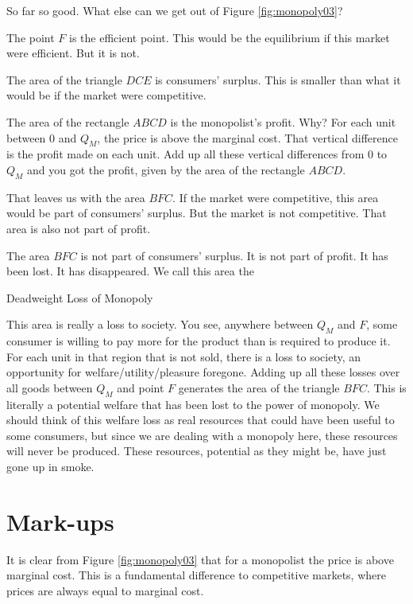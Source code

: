 \documentclass[
]{book}
\begin{document}
So far so good. What else can we get out of Figure \ref{fig:monopoly03}?

The point \(F\) is the efficient point. This would be the equilibrium if this market were efficient. But it is not.

The area of the triangle \(DCE\) is consumers' surplus. This is smaller than what it would be if the market were competitive.

The area of the rectangle \(ABCD\) is the monopolist's profit. Why? For each unit between \(0\) and \(Q_M\), the price is above the marginal cost. That vertical difference is the profit made on each unit. Add up all these vertical differences from \(0\) to \(Q_M\) and you got the profit, given by the area of the rectangle \(ABCD\).

That leaves us with the area \(BFC\). If the market were competitive, this area would be part of consumers' surplus. But the market is not competitive. That area is also not part of profit.

The area \(BFC\) is not part of consumers' surplus. It is not part of profit. It has been lost. It has disappeared. We call this area the

\begin{center}
Deadweight Loss of Monopoly

\end{center}

This area is really a loss to society. You see, anywhere between \(Q_M\) and \(F\), some consumer is willing to pay more for the product than is required to produce it. For each unit in that region that is not sold, there is a loss to society, an opportunity for welfare/utility/pleasure foregone. Adding up all these losses over all goods between \(Q_M\) and point \(F\) generates the area of the triangle \(BFC\). This is literally a potential welfare that has been lost to the power of monopoly. We should think of this welfare loss as real resources that could have been useful to some consumers, but since we are dealing with a monopoly here, these resources will never be produced. These resources, potential as they might be, have just gone up in smoke.

\hypertarget{mark-ups}{%
\section{Mark-ups}\label{mark-ups}}

It is clear from Figure \ref{fig:monopoly03} that for a monopolist the price is above marginal cost. This is a fundamental difference to competitive markets, where prices are always equal to marginal cost.
\end{document}
